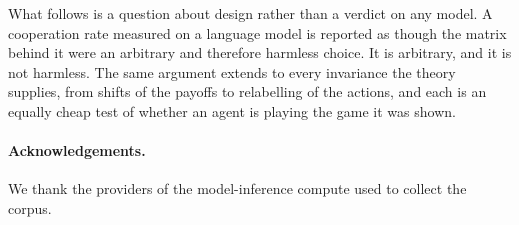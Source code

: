 \documentclass[11pt,a4paper]{article}
\begin{document}
What follows is a question about design rather than a verdict on any model. A
cooperation rate measured on a language model is reported as though the matrix
behind it were an arbitrary and therefore harmless choice. It is arbitrary, and
it is not harmless. The same argument extends to every invariance the theory
supplies, from shifts of the payoffs to relabelling of the actions, and each is
an equally cheap test of whether an agent is playing the game it was shown.

%
%

\paragraph{Acknowledgements.} We thank the providers of the model-inference
compute used to collect the corpus.
\end{document}

